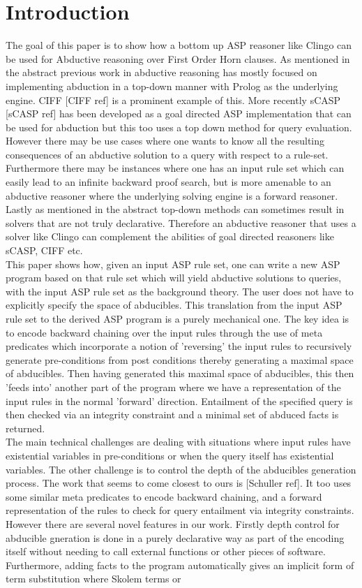 \section{Introduction}\label{sec:introduction}

The goal of this paper is to show how a bottom up ASP reasoner like Clingo can be used for Abductive reasoning over First Order Horn clauses. As mentioned in the abstract previous work in abductive reasoning has mostly focused on implementing abduction in a top-down manner with Prolog as the underlying engine. CIFF [CIFF ref] is a prominent example of this. More recently sCASP [sCASP ref] has been developed as a goal directed ASP implementation that can be used for abduction but this too uses a top down method for query evaluation. However there may be use cases where one wants to know all the resulting consequences of an abductive solution to a query with respect to a rule-set. Furthermore there may be instances where one has an input rule set which can easily lead to an infinite backward proof search, but is more amenable to an abductive reasoner where the underlying solving engine is a forward reasoner. Lastly as mentioned in the abstract top-down methods can sometimes result in solvers that are not truly declarative. Therefore an abductive reasoner that uses a solver like Clingo can
complement the abilities of goal directed reasoners like sCASP, CIFF etc.\\ This paper shows how, given an input ASP rule set, one can write a new ASP program based on that rule set which will yield abductive solutions to queries, with the input ASP rule set as the background theory. The user does not have to explicitly specify the space of abducibles. This translation from the input ASP rule set to the derived ASP program is a purely mechanical one. The key idea is to encode backward chaining over the input rules through the use of meta predicates which incorporate a notion of 'reversing' the input rules to recursively generate pre-conditions from post conditions thereby generating a maximal space of abducibles. Then having generated this maximal space of abducibles, this then 'feeds into' another part of the program where we have a representation of the input rules in the normal 'forward' direction. Entailment of the specified query is then checked via an integrity constraint and a minimal set of abduced facts is returned.\\ The main technical challenges are dealing with situations where input rules have existential variables in pre-conditions or when the query itself has existential variables. The other challenge is to control the depth of the abducibles generation process. The work that seems to come closest to ours is [Schuller ref]. It too uses some similar meta predicates to encode backward chaining, and a forward representation of the rules to check for query entailment via integrity constraints.\\ However there are several novel features in our work.  Firstly depth  control for abducible gneration is done in a purely declarative way as part of the encoding itself without needing to call external functions or other pieces of software. Furthermore, adding facts to the program automatically gives an implicit form of term substitution where Skolem terms or
